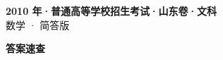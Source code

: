 \documentclass[zihao=-4, a4paper]{ctexart}
\begin{document}
\begin{center}
  {\Large\bfseries 2010 年·普通高等学校招生考试·山东卷·文科}\\[4pt]
  {\large 数学 · 简答版}
\end{center}
\medskip
{}

\clearpage
{}
\begin{center}{\Large\bfseries 答案速查}\end{center}
\medskip

\end{document}
